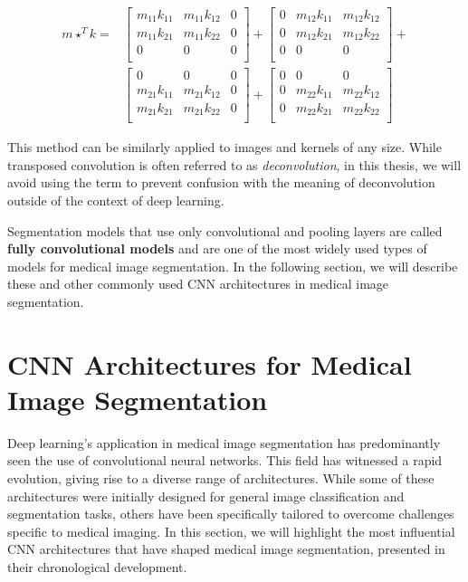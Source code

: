 \begin{align*}
m \star^T k = & 
\begin{bmatrix}
m_{11}k_{11} & m_{11}k_{12} & 0\\
m_{11}k_{21} & m_{11}k_{22} & 0\\
0 & 0 & 0\\
\end{bmatrix}
+
\begin{bmatrix}
0 & m_{12}k_{11} & m_{12}k_{12}\\
0 & m_{12}k_{21} & m_{12}k_{22}\\
0 & 0 & 0\\
\end{bmatrix}
+\\
&
\begin{bmatrix}
0 & 0 & 0\\
m_{21}k_{11} & m_{21}k_{12} & 0\\
m_{21}k_{21} & m_{21}k_{22} & 0\\
\end{bmatrix}
+
\begin{bmatrix}
0 & 0 & 0\\
0 & m_{22}k_{11} & m_{22}k_{12}\\
0 & m_{22}k_{21} & m_{22}k_{22}\\
\end{bmatrix}
\end{align*}

This method can be similarly applied to images and kernels of any size. While transposed convolution is often referred to as \textit{deconvolution}, in this thesis, we will avoid using the term to prevent confusion with the meaning of deconvolution outside of the context of deep learning.

Segmentation models that use only convolutional and pooling layers are called \textbf{fully convolutional models} and are one of the most widely used types of models for medical image segmentation. In the following section, we will describe these and other commonly used CNN architectures in medical image segmentation.

\section{CNN Architectures for Medical Image Segmentation}

Deep learning's application in medical image segmentation has predominantly seen the use of convolutional neural networks. This field has witnessed a rapid evolution, giving rise to a diverse range of architectures. While some of these architectures were initially designed for general image classification and segmentation tasks, others have been specifically tailored to overcome challenges specific to medical imaging. In this section, we will highlight the most influential CNN architectures that have shaped medical image segmentation, presented in their chronological development.

